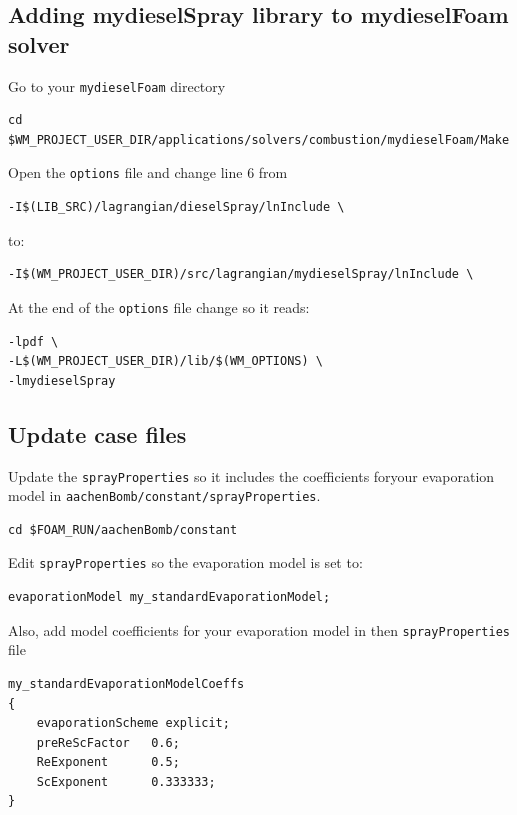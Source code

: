 \documentclass{report}
\begin{document}
\subsection{Adding mydieselSpray library to mydieselFoam solver}
Go to your \verb+mydieselFoam+ directory 
\begin{verbatim}
cd $WM_PROJECT_USER_DIR/applications/solvers/combustion/mydieselFoam/Make
\end{verbatim}
Open the \verb+options+ file and change line 6 from 
\begin{verbatim}
-I$(LIB_SRC)/lagrangian/dieselSpray/lnInclude \
\end{verbatim}
to:
\begin{verbatim}
-I$(WM_PROJECT_USER_DIR)/src/lagrangian/mydieselSpray/lnInclude \
\end{verbatim}
At the end of the \verb+options+ file change so it reads:
\begin{verbatim}
-lpdf \
-L$(WM_PROJECT_USER_DIR)/lib/$(WM_OPTIONS) \
-lmydieselSpray
\end{verbatim}
\subsection{Update case files}
Update the \verb+sprayProperties+ so it includes the coefficients for\newline \noindent your evaporation model in \verb+aachenBomb/constant/sprayProperties+. 
\begin{verbatim}
cd $FOAM_RUN/aachenBomb/constant
\end{verbatim}
Edit \verb+sprayProperties+ so the evaporation model is set to:
\begin{verbatim}
evaporationModel my_standardEvaporationModel;
\end{verbatim}
Also, add model coefficients for your evaporation model in then \verb+sprayProperties+ file  

\begin{verbatim}
my_standardEvaporationModelCoeffs
{ 
    evaporationScheme explicit; 
    preReScFactor   0.6; 
    ReExponent      0.5; 
    ScExponent      0.333333; 
}
\end{verbatim}
\end{document}
